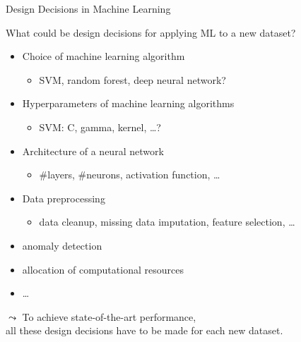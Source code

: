 \begin{frame}[c]{Design Decisions in Machine Learning}

What could be design decisions for applying ML to a new dataset?

\pause

\begin{itemize}
  \item Choice of machine learning algorithm
  \begin{itemize}
    \item SVM, random forest, deep neural network?
  \end{itemize}
  \pause
  \item Hyperparameters of machine learning algorithms
  \begin{itemize}
    \item SVM: C, gamma, kernel, \ldots?
  \end{itemize}
  \pause
  \item Architecture of a neural network
  \begin{itemize}
    \item $\#$layers, $\#$neurons, activation function, \ldots 
  \end{itemize}
  \pause
  \item Data preprocessing
  \begin{itemize}
  	\item data cleanup, missing data imputation, feature selection, \ldots  
  \end{itemize}
  \pause
  \item anomaly detection
  \item allocation of computational resources
  \item \ldots
\end{itemize}

\medskip
$\leadsto$ To achieve state-of-the-art performance,\\ all these design decisions have to be made for each new dataset.

\end{frame}
